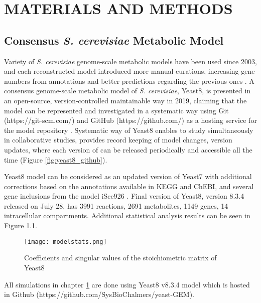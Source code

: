 \chapter{MATERIALS AND METHODS} \label{chapter:yeast8}

\section{Consensus \emph{S. cerevisiae} Metabolic Model}
Variety of \emph{S. cerevisiae} genome-scale metabolic models have been used since 2003, and each reconstructed model introduced more manual curations, increasing gene numbers from annotations and better predictions regarding the previous ones \cite{lopes2017genome}. A consensus genome-scale metabolic model of \emph{S. cerevisiae}, Yeast8, is presented in an open-source, version-controlled maintainable way in 2019, claiming that the model can be represented and investigated in a systematic way using Git (https://git-scm.com/) and GitHub (https://github.com/) as a hosting service for the model repository \cite{lu2019consensus}. Systematic way of Yeast8 enables to study simultaneously in collaborative studies, provides record keeping of model changes, version updates, where each version of can be released periodically and accessible all the time (Figure \ref{fig:yeast8_github}).

Yeast8 model can be considered as an updated version of Yeast7 \cite{aung2013revising} with additional corrections based on the annotations available in KEGG and ChEBI, and several gene inclusions from the model iSce926 \cite{chowdhury2015using}. Final version of Yeast8, version 8.3.4 released on July 28, has 3991 reactions, 2691 metabolites, 1149 genes, 14 intracellular compartments. Additional statistical analysis results can be seen in Figure \ref{fig:modelstats}.

\begin{figure}[H]
\begin{center}
\texttt{[image: modelstats.png]}
\end{center}
\caption[Coefficients and singular values of the stoichiometric matrix of Yeast8]{Coefficients and singular values of the stoichiometric matrix of Yeast8}
\label{fig:modelstats}
\end{figure}

All simulations in chapter \cref{chapter:yeast8} are done using Yeast8 v8.3.4 model which is hosted in Github (https://github.com/SysBioChalmers/yeast-GEM).

